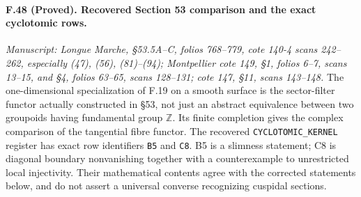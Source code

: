 \paragraph{F.48 (Proved). Recovered Section 53 comparison and the exact cyclotomic rows.}
\textit{Manuscript: Longue Marche, \S53.5A--C, folios 768--779,
cote 140-4 scans 242--262, especially (47), (56), (81)--(94);
Montpellier cote 149, \S1, folios 6--7, scans 13--15, and \S4,
folios 63--65, scans 128--131; cote 147, \S11, scans 143--148.}
The one-dimensional specialization of F.19 on a smooth surface is the sector-filter
functor actually constructed in \S53, not just an abstract equivalence
between two groupoids having fundamental group $\mathbb Z$. Its finite
completion gives the complex comparison of the tangential fibre functor.
The recovered \texttt{CYCLOTOMIC\_KERNEL} register has exact row identifiers
\texttt{B5} and \texttt{C8}. B5 is a slimness statement; C8 is diagonal
boundary nonvanishing together with a counterexample to unrestricted
local injectivity. Their mathematical contents agree with the corrected
statements below, and do not assert a universal converse recognizing
cuspidal sections.

